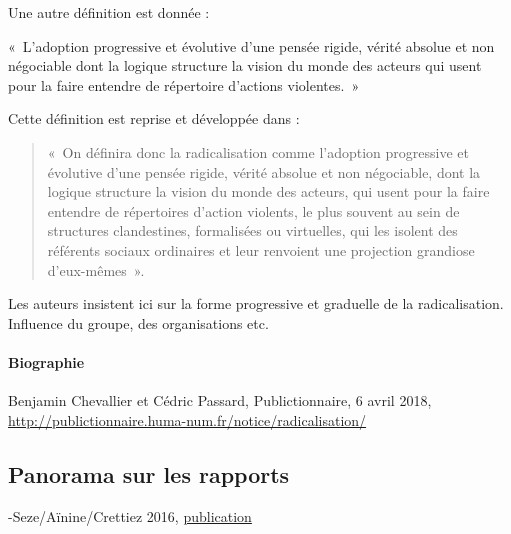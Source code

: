 Une autre définition est donnée :
\begin{Def}[Radicalisation]
« L’adoption progressive et évolutive d’une pensée rigide, vérité absolue et non négociable dont la logique structure la vision du monde des acteurs qui usent pour la faire entendre de répertoire d’actions violentes. »  

\end{Def}
Cette définition est reprise et développée dans : 
\begin{quote}
    « On définira donc la radicalisation comme l’adoption progressive et évolutive d’une pensée rigide, vérité absolue et non négociable, dont la logique structure la vision du monde des acteurs, qui usent pour la faire entendre de répertoires d’action violents, le plus souvent au sein de structures clandestines, formalisées ou virtuelles, qui les isolent des référents sociaux ordinaires et leur renvoient une projection grandiose d’eux-mêmes ». 
\end{quote}

\begin{Synthesis}
Les auteurs insistent ici sur la forme progressive et graduelle de la radicalisation. Influence du groupe, des organisations etc.
\end{Synthesis}

\paragraph{Biographie}
 Benjamin Chevallier et Cédric Passard, Publictionnaire, 6 avril 2018,  \url{http://publictionnaire.huma-num.fr/notice/radicalisation/}


\subsection{ Panorama sur les rapports}


-Seze/Aïnine/Crettiez 2016, \href{http://www.gip-recherche-justice.fr/publication/saisir-les-mecanismes-de-la-radicalisation-violente-pour-une-analyse-processuelle-et-biographique-des-engagements-violents/ }{publication}

